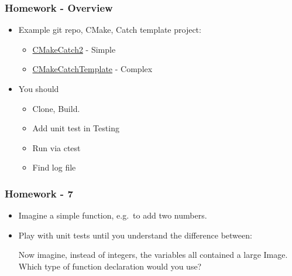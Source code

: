 \subsubsection{Homework - Overview}\label{homework---overview}

\begin{itemize}
\itemsep1pt\parskip0pt
\item
  Example git repo, CMake, Catch template project:

  \begin{itemize}
  \itemsep1pt\parskip0pt
  \item
    \href{https://github.com/MattClarkson/CMakeCatch2}{CMakeCatch2} -
    Simple
  \item
    \href{https://github.com/MattClarkson/CMakeCatchTemplate}{CMakeCatchTemplate}
    - Complex
  \end{itemize}
\item
  You should

  \begin{itemize}
  \itemsep1pt\parskip0pt
  \item
    Clone, Build.
  \item
    Add unit test in Testing
  \item
    Run via ctest
  \item
    Find log file
  \end{itemize}
\end{itemize}

\subsubsection{Homework - 7}\label{homework---7}

\begin{itemize}
\item
  Imagine a simple function, e.g.~to add two numbers.
\item
  Play with unit tests until you understand the difference between:

\begin{Shaded}
\begin{Highlighting}[]
   
   
 
  \NormalTok{* }  \NormalTok{* } 
\end{Highlighting}
\end{Shaded}

  Now imagine, instead of integers, the variables all contained a large
  Image. Which type of function declaration would you use?
\end{itemize}

